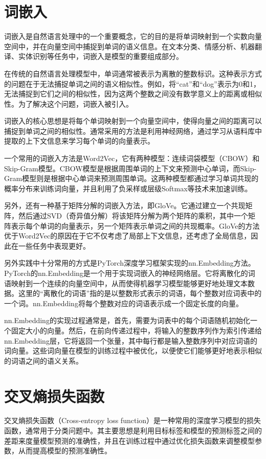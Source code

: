 \documentclass{report}
\begin{document}
	\section{词嵌入}
	
	词嵌入是自然语言处理中的一个重要概念，它的目的是将单词映射到一个实数向量空间中，并在向量空间中捕捉到单词的语义信息。在文本分类、情感分析、机器翻译、实体识别等任务中，词嵌入是模型的重要组成部分。
	
	在传统的自然语言处理模型中，单词通常被表示为离散的整数标识。这种表示方式的问题在于无法捕捉单词之间的语义相似性。例如，将“cat”和“dog”表示为0和1，无法捕捉到它们之间的相似性，因为这两个整数之间没有数学意义上的距离或相似性。为了解决这个问题，词嵌入被引入。
	
	词嵌入的核心思想是将每个单词映射到一个向量空间中，使得向量之间的距离可以捕捉到单词之间的相似性。通常采用的方法是利用神经网络，通过学习从语料库中提取的上下文信息来学习每个单词的向量表示。
	
	一个常用的词嵌入方法是Word2Vec，它有两种模型：连续词袋模型（CBOW）和Skip-Gram模型。CBOW模型是根据周围单词的上下文来预测中心单词，而Skip-Gram模型则是根据中心单词来预测周围单词。这两种模型都通过学习单词共现的概率分布来训练词向量，并且利用了负采样或层级Softmax等技术来加速训练。
	
	另外，还有一种基于矩阵分解的词嵌入方法，即GloVe。它通过建立一个共现矩阵，然后通过SVD（奇异值分解）将该矩阵分解为两个矩阵的乘积，其中一个矩阵表示每个单词的向量表示，另一个矩阵表示单词之间的共现概率。GloVe的方法优于Word2Vec的原因在于它不仅考虑了局部上下文信息，还考虑了全局信息，因此在一些任务中表现更好。
	
	另外实践中十分常用的方式是PyTorch深度学习框架实现的nn.Embedding方法。PyTorch的nn.Embedding是一个用于实现词嵌入的神经网络层。它将离散化的词语映射到一个连续的向量空间中，从而使得机器学习模型能够更好地处理文本数据。这里的“离散化的词语”指的是以整数形式表示的词语，每个整数对应词表中的一个词。nn.Embedding将每个整数对应的词语表示成一个固定长度的向量。
	
	nn.Embedding的实现过程通常是，首先，需要为词表中的每个词语随机初始化一个固定大小的向量。然后，在前向传递过程中，将输入的整数序列作为索引传递给nn.Embedding层，它将返回一个张量，其中每行都是输入整数序列中对应词语的词向量。这些词向量在模型的训练过程中被优化，以便使它们能够更好地表示相似的词语之间的语义关系。
	
	
	\section{交叉熵损失函数}
	交叉熵损失函数（Cross-entropy loss function）是一种常用的深度学习模型的损失函数，通常用于分类问题中。其主要思想是利用目标标签和模型的预测标签之间的差距来度量模型预测的准确性，并且在训练过程中通过优化损失函数来调整模型参数，从而提高模型的预测准确性。
	
\end{document}
